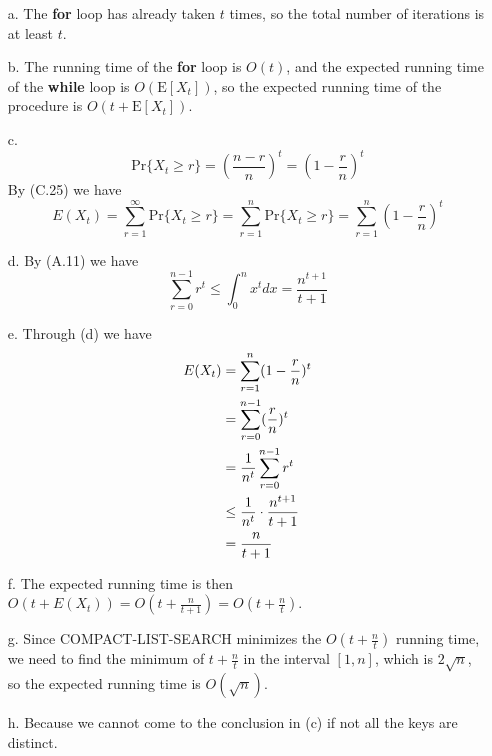 \documentclass[12pt, a4paper, UTF8]{ctexart}
\begin{document}
\begin{solution}
  \begin{itemize}
    \item [a.] The \textbf{for} loop has already taken $t$ times, so the total 
      number of iterations is at least $t$.
    \item [b.] The running time of the \textbf{for} loop is $O(t)$, and the 
      expected running time of the \textbf{while} loop is $O(\text{E}[X_{t}])$, 
      so the expected running time of the procedure is $O(t + \text{E}[X_{t}])$.
    \item [c.] \[ \text{Pr}\{ X_{t}\geq r \} = (\frac{n-r}{n})^{t} = (1 - \frac{r}{n})^{t} \]
      By (C.25) we have
      \[ E(X_{t}) = \sum_{r = 1}^{\infty}\text{Pr}\{ X_{t}\geq r\} = 
      \sum_{r = 1}^{n}\text{Pr}\{X_{t}\geq r \} = \sum_{r = 1}^{n}(1 - \frac{r}{n})^{t} \]
    \item [d.] By (A.11) we have
      \[ \sum_{r = 0}^{n-1}r^{t}\leq \int_{0}^{n} x^{t}dx = \frac{n^{t + 1}}{t + 1} \]
    \item [e.] Through (d) we have
      \begin{align}
        E(X_{t}) & = \sum_{r = 1}^{n}(1 - \frac{r}{n})^{t} \notag \\
                 & = \sum_{r = 0}^{n-1}(\frac{r}{n})^{t} \notag \\
                 & = \frac{1}{n^{t}}\sum_{r = 0}^{n - 1}r^{t} \notag \\
                 & \leq \frac{1}{n^{t}}\cdot\frac{n^{t + 1}}{t + 1} \notag \\
                 & = \frac{n}{t + 1} \notag
      \end{align}
    \item [f.] The expected running time is then $O(t + E(X_{t})) = O(t + \frac{n}{t + 1}) 
      = O(t + \frac{n}{t})$.
    \item [g.] Since COMPACT-LIST-SEARCH minimizes the $O(t + \frac{n}{t})$ running 
      time, we need to find the minimum of $t + \frac{n}{t}$ in the interval $[1,n]$, 
      which is $2\sqrt{n}$, so the expected running time is $O(\sqrt{n})$.
    \item [h.] Because we cannot come to the conclusion in (c) if not all the keys 
      are distinct.
  \end{itemize}

\end{solution}

\end{document}
